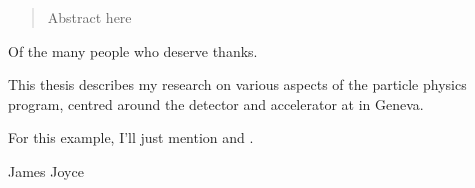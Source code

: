 
\begin{abstract}%
  Abstract here
\end{abstract}


\begin{acknowledgements}
  Of the many people who deserve thanks.
\end{acknowledgements}


\begin{preface}
  This thesis describes my research on various aspects of the \ATLAS
  particle physics program, centred around the \ATLAS detector and \LHC
  accelerator at \CERN in Geneva.

  \noindent
  For this example, I'll just mention 
  and .
\end{preface}

\tableofcontents


%
  {James Joyce}
\thispagestyle{empty}
